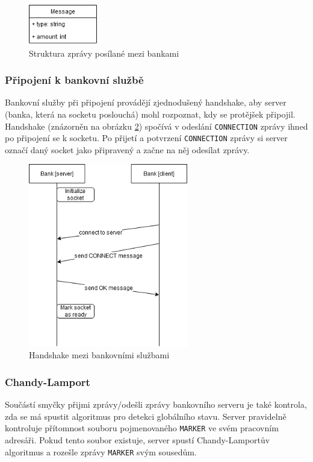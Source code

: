 \documentclass[11pt,a4paper]{scrartcl}
\begin{document}
	\begin{figure}[H]
		\centering
		\includegraphics[width=3cm]{img/message.png}
		\caption{Struktura zprávy posílané mezi bankami}
		\label{fig:message}
	\end{figure}
	
	\subsubsection{Připojení k bankovní službě}
	Bankovní služby při připojení provádějí zjednodušený handshake,	aby server (banka, která na socketu poslouchá) mohl rozpoznat, kdy se protějšek připojil. Handshake (znázorněn na obrázku \ref{fig:handshake}) spočívá v odeslání \verb|CONNECTION| zprávy ihned po připojení se k socketu. Po přijetí a potvrzení \verb|CONNECTION| zprávy si server označí daný socket jako připravený a začne na něj odesílat zprávy.

	\begin{figure}[H]
		\centering
		\includegraphics[height=8cm]{img/bank-handshake.png}
		\caption{Handshake mezi bankovními službami}
		\label{fig:handshake}
	\end{figure}
	
	\subsubsection{Chandy-Lamport}
	Součástí smyčky přijmi zprávy/odešli zprávy bankovního serveru je také kontrola, zda se má spustit algoritmus pro detekci globálního stavu. Server pravidelně kontroluje přítomnost souboru pojmenovaného \verb|MARKER| ve svém pracovním adresáři. Pokud tento soubor existuje, server spustí Chandy-Lamportův algoritmus a rozešle zprávy \verb|MARKER| svým sousedům.
	
\end{document}
